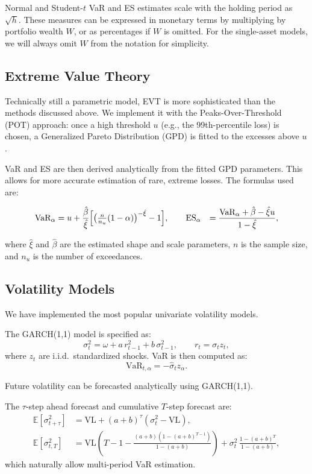 \documentclass{article}
\begin{document}
Normal and Student-$t$ VaR and ES estimates scale with the holding period as $\sqrt{h}$. These measures can be expressed in monetary terms by multiplying by portfolio wealth $W$, or as percentages if $W$ is omitted. For the single-asset models, we will always omit $W$ from the notation for simplicity.




\subsection{Extreme Value Theory}


Technically still a parametric model, EVT is more sophisticated than the methods discussed above. We implement it with the Peaks-Over-Threshold (POT) approach: once a high threshold $u$ (e.g., the 99th-percentile loss) is chosen, a Generalized Pareto Distribution (GPD) is fitted to the excesses above $u$. 

VaR and ES are then derived analytically from the fitted GPD parameters. This allows for more accurate estimation of rare, extreme losses. The formulas used are:

\[
\begin{aligned}
{\text{VaR}}_\alpha &= u + \frac{\hat{\beta}}{\hat{\xi}}
\Bigl[\bigl(\tfrac{n}{n_u}(1-\alpha)\bigr)^{-\hat{\xi}} - 1\Bigr],\qquad
{\text{ES}}_\alpha &= \frac{{\text{VaR}}_\alpha + \hat{\beta} - \hat{\xi} u}{1 - \hat{\xi}},
\end{aligned}
\]

where $\hat{\xi}$ and $\hat{\beta}$ are the estimated shape and scale parameters, $n$ is the sample size, and $n_u$ is the number of exceedances.


\subsection{Volatility Models}

We have implemented the most popular univariate volatility models.

The GARCH(1,1) model is specified as:
\[
  \sigma_t^2 = \omega + a\, r_{t-1}^2 + b\, \sigma_{t-1}^2, \qquad r_t = \sigma_t z_t,
\]
where \( z_t \) are i.i.d.\ standardized shocks. VaR is then computed as:
\[
  \text{VaR}_{t,\alpha} = -\hat{\sigma}_t z_\alpha.
\]

Future volatility can be forecasted analytically using GARCH(1,1).

The \( \tau \)-step ahead forecast and cumulative \( T \)-step forecast are:
\begin{align*}
  \mathbb{E}[\sigma_{t+\tau}^2] &= \mathrm{VL} + (a + b)^\tau(\sigma_t^2 - \mathrm{VL}),  \\  
  \mathbb{E}[\sigma_{t,T}^2] &= \mathrm{VL}\left(T - 1 - \frac{(a + b)(1 - (a + b)^{T - 1})}{1 - (a + b)}\right)
    + \sigma_t^2\, \frac{1 - (a + b)^T}{1 - (a + b)},
\end{align*}
which naturally allow multi-period VaR estimation.
\end{document}

